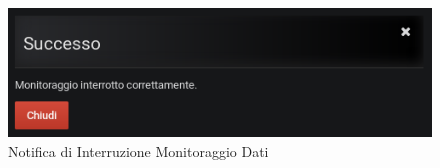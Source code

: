 \begin{figure}[H]
	\begin{center}
		\includegraphics[scale=0.6]{./images/NotificaInterruzione.png}
		 \caption{Notifica di Interruzione Monitoraggio Dati}	
		 \label{NotificaInterruzione}
	\end{center}
\end{figure}
